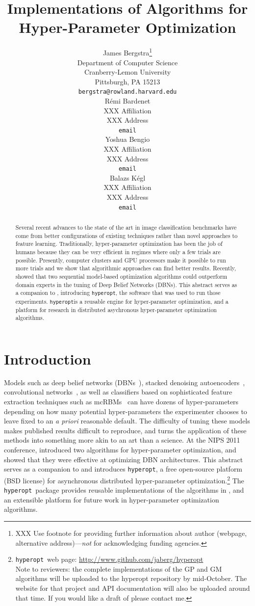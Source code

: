 \documentclass{article}
\title{Implementations of Algorithms for Hyper-Parameter Optimization}
\author{
James Bergstra\thanks{XXX Use footnote for providing further information
about author (webpage, alternative address)---\emph{not} for acknowledging
funding agencies.} \\
Department of Computer Science\\
Cranberry-Lemon University\\
Pittsburgh, PA 15213 \\
\texttt{bergstra@rowland.harvard.edu} \\
\And
R{\'e}mi Bardenet \\
XXX Affiliation \\
XXX Address \\
\texttt{email} \\
\AND
Yoshua Bengio \\
XXX Affiliation \\
XXX Address \\
\texttt{email} \\
\And
Balazs K{\'e}gl \\
XXX Affiliation \\
XXX Address \\
\texttt{email}
}
\newcommand{\vs}[1]{\vspace*{-#1mm}}
\newcommand{\Bs}{\vs{2}}
\newcommand{\as}{\vs{1}}
\renewcommand{\citet}{\cite}
\newcommand{\hyperopt}{{\tt hyperopt}}
\begin{document}
\maketitle
\begin{abstract}
\vs{2}
    Several recent advances to the state of the art in image classification benchmarks have come
    from better configurations of existing techniques rather than novel approaches to
    feature learning.
    Traditionally,
    hyper-parameter optimization has been the job of humans because they can be very efficient in regimes where only a few trials are possible.
    Presently, computer clusters and GPU processors make it possible to run more trials
    and we show that algorithmic approaches can find better results.
    Recently, \cite{nipspaper} showed that
    two sequential model-based optimization algorithms
    could outperform domain experts in the tuning of 
    Deep Belief Networks (DBNs).
    This abstract serves as a companion to \cite{nipspaper},
    introducing \hyperopt, the software
    that was used to run those experiments.
    \hyperopt is a reusable engine for hyper-parameter optimization, and a platform for research in distributed asychronous hyper-parameter optimization algorithms.
\vs{3}
\end{abstract}

\Bs
\section{Introduction}
\as

Models such as deep belief networks (DBNs~\citep{hinton+osindero+teh:2006}),
stacked denoising autoencoders~\citep{vincent+larochelle+lajoie+bengio+manzagol:2010},
convolutional networks~\citep{lecun+bottou+bengio+haffner:1998},
as well as classifiers based on sophisticated feature extraction techniques such as
mcRBMs~\citep{ranzato+hinton:2010}
can have dozens of hyper-parameters depending on how many
potential hyper-parameters the experimenter chooses to leave fixed to an {\it a priori} reasonable default.
The difficulty of tuning these models makes published results difficult to
reproduce, and turns the application of these methods into something more akin
to an art than a science.
At the NIPS 2011 conference, \citet{nipspaper} introduced
two algorithms for hyper-parameter optimization, and showed that they were effective
at optimizing DBN architectures.
This abstract serves as a companion to \citet{nipspaper}
and introduces \hyperopt, a free open-source platform (BSD license) for
asynchronous distributed hyper-parameter optimization.\footnote{
\hyperopt\ web page: \url{http://www.github.com/jaberg/hyperopt}\\
Note to reviewers: the complete implementations of the GP and GM algorithms will be
uploaded to the hyperopt repository by mid-October.
The website for that project and API documentation will also be uploaded around that time.
If you would like a draft of \citet{nipspaper} please contact me.
}
The \hyperopt\ package provides reusable implementations of the algorithms in \citet{nipspaper}, and an extensible platform for future work in hyper-parameter optimization algorithms.
\end{document}
